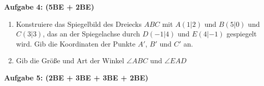 \documentclass[a4paper,12pt]{article}
\newcommand{\Aufgabe}[1]{
  {
  \vspace*{0.5cm}
  \textsf{\textbf{Aufgabe #1}}
  \vspace*{0.2cm}
  
  }
}
\begin{document}
\newpage
\vspace*{-2cm}
\Aufgabe{4: (5BE + 2BE)}
\begin{enumerate}[label={\alph*)}]
  \item Konstruiere das Spiegelbild des Dreiecks $ABC$ mit $A(1|2)$ und $B(5|0)$ und $C(3|3)$, das an der Spiegelachse durch $D(-1|4)$ und $E(4|-1)$ gespiegelt wird. 
\vspace{190mm}
    Gib die Koordinaten der Punkte $A'$, $B'$ und $C'$ an.
  \item Gib die Größe und Art der Winkel $\angle ABC$ und $\angle EAD$
\vspace{50mm}
\end{enumerate}

\newpage
\vspace*{-2cm}

\Aufgabe{5: (2BE + 3BE + 3BE + 2BE)}
\end{document}
